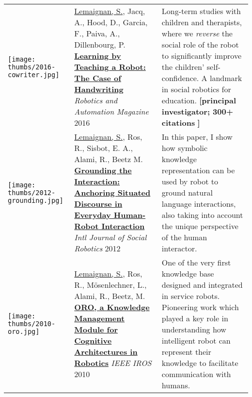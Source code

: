 \begin{tabular}{p{1.7cm}p{7cm}p{8cm}}
    \vspace{-.20cm}\texttt{[image: thumbs/2016-cowriter.jpg]} &

    \ul{Lemaignan, S.}, Jacq, A., Hood, D., Garcia, F., Paiva, A., Dillenbourg, P.
    \newline
    \href{https://doi.org/10.1109/MRA.2016.2546700}{\textbf{Learning by
    Teaching a Robot: The Case of Handwriting}}
    \newline \textit{Robotics and Automation Magazine} 2016
    & \small Long-term studies with children and
    therapists, where we \emph{reverse} the social role of the
    robot to significantly improve the children' self-confidence. A landmark in
    social robotics for education. \textbf{\newline[principal investigator; 300+
    citations} \textbf{]}\\


    \vspace{-.20cm}\texttt{[image: thumbs/2012-grounding.jpg]} &

    \ul{Lemaignan, S.}, Ros, R., Sisbot, E. A., Alami, R., Beetz M.
    \href{https://doi.org/10.1007/s12369-011-0123-x}{\textbf{Grounding
    the Interaction: Anchoring Situated Discourse in Everyday Human-Robot
    Interaction}} 
    \newline \textit{Intl Journal of Social Robotics} 2012

    & \small In this paper, I show how symbolic knowledge representation can be
    used by robot to ground natural language interactions, also taking into
    account the unique perspective of the human interactor.
    \textbf{}\\

    \vspace{-.20cm}\texttt{[image: thumbs/2010-oro.jpg]} &
    \ul{Lemaignan, S.}, Ros, R., Mösenlechner, L., Alami, R., Beetz, M.
    \newline\href{https://doi.org/10.1109/IROS.2010.5649547}{\textbf{ORO, a Knowledge Management Module for Cognitive Architectures in
    Robotics}}
    \newline \textit{IEEE IROS} 2010

    & \small One of the very first knowledge base designed and
    integrated in service robots. Pioneering work which played a key role in
    understanding how intelligent robot can represent their
    knowledge to facilitate communication with humans.
    \textbf{}\\

\end{tabular}



